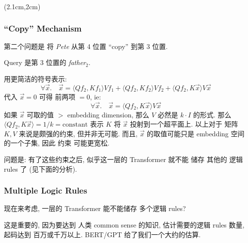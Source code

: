 \begin{preview}
\begin{minipage}{\textwidth}
	
\setlength{\parskip}{0.4\baselineskip}
\begin{textblock*}{20cm}(2.1cm,2cm) %
	{}
	\hspace{8cm}
\end{textblock*}

\vspace*{0.3cm} 

\subsubsection{``Copy'' Mechanism}

第二个问题是 将 \textit{Pete} 从第 4 位置 ``copy'' 到第 3 位置.

Query 是第 3 位置的 \textit{father}$_2$.

用更简洁的符号表示:
\begin{equation}
\forall \vec{x}. \quad \vec{x} = \langle Q f_2, K f_1 \rangle V f_1 + \langle Q f_2, K f_2 \rangle V f_2 + \langle Q f_2, K \vec{x} \rangle V \vec{x}
\end{equation}
代入 $\vec{x} = 0$ 可得 前两项 $= 0$, ie:
\begin{equation}
\forall \vec{x}. \quad \vec{x} = \langle Q f_2, K \vec{x} \rangle V \vec{x}
\end{equation}
如果 $\vec{x}$ 可取的值 $>$ embedding dimension, 那么 $V$ 必然是 $k \cdot I$ 的形式.  那么 $\langle Q f_2, K \vec{x} \rangle = 1/k = \mbox{constant}$ 表示 $K$ 将 $\vec{x}$ 投射到一个超平面上.  以上对于 矩阵 $K, V$ 来说是颇强的约束, 但并非无可能.  而且, $\vec{x}$ 的取值可能只是 embedding 空间的一个子集, 因此 约束 可能更宽松.

问题是: 有了这些约束之后, 似乎这一层的 Transformer 就不能 储存 其他的 逻辑 rules 了 (见下面的分析).  

\subsubsection{Multiple Logic Rules}

现在来考虑, 一层的 Transformer 能不能储存 多个逻辑 rules?

这是重要的, 因为要达到 人类 common sense 的知识, 估计需要的逻辑 rules 数量, 起码达到 百万或千万以上.  BERT/GPT 给了我们一个大约的估算.


\end{minipage}
\end{preview}
